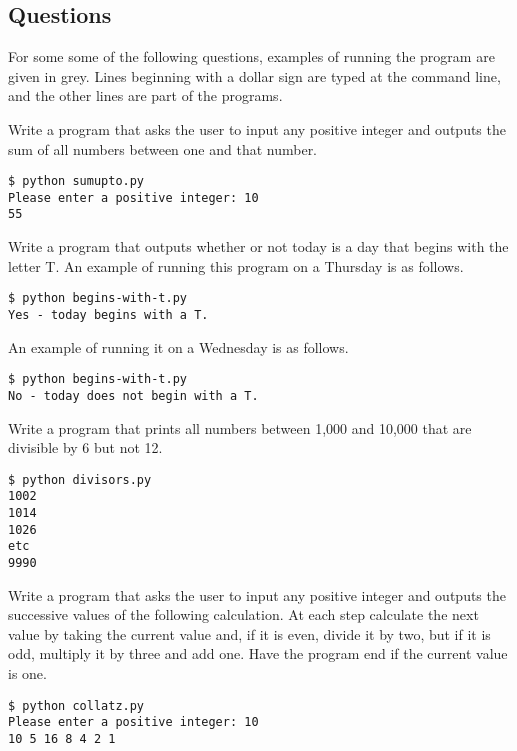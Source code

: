 \documentclass[a4paper, 12pt]{exam}
\begin{document}
  
  


\subsection*{Questions}
  
  For some some of the following questions, examples of running the program are given in grey.
  Lines beginning with a dollar sign are typed at the command line, and the other lines are part of the programs.

  \begin{questions}

    \question
    Write a program that asks the user to input any positive integer and outputs the sum of all numbers between one and that number.
    \begin{verbatim}
$ python sumupto.py
Please enter a positive integer: 10
55
    \end{verbatim}

    \question
      Write a program that outputs whether or not today is a day that begins with the letter T.
      An example of running this program on a Thursday is as follows.
    \begin{verbatim}
$ python begins-with-t.py
Yes - today begins with a T.
    \end{verbatim}
      An example of running it on a Wednesday is as follows.
      \begin{verbatim}
$ python begins-with-t.py
No - today does not begin with a T.
      \end{verbatim}


      \question
      Write a program that prints all numbers between 1,000 and 10,000 that are divisible by 6 but not 12.
      \begin{verbatim}
$ python divisors.py
1002
1014
1026
etc
9990
      \end{verbatim}

    \question
      Write a program that asks the user to input any positive integer and outputs the successive values of the following calculation.
      At each step calculate the next value by taking the current value and, if it is even, divide it by two, but if it is odd, multiply it by three and add one.
      Have the program end if the current value is one.
      \begin{verbatim}
$ python collatz.py
Please enter a positive integer: 10
10 5 16 8 4 2 1
      \end{verbatim}


\end{questions}
\end{document}
